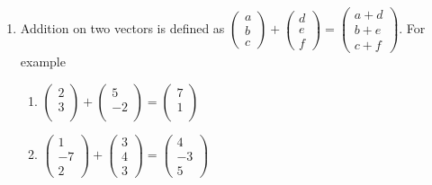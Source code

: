 \documentclass{article}
\begin{document}
\begin{enumerate}
    \item Addition on two vectors is defined as $ \begin{pmatrix}
  a\\
  b\\
  c
 \end{pmatrix}
 +
 \begin{pmatrix}
 d\\
 e\\
 f
\end{pmatrix}
=
 \begin{pmatrix}
a+d\\
b+e\\
c+f
\end{pmatrix}$. For example
            \begin{enumerate}
                 \item $\begin{pmatrix} 2\\ 3\\ \end{pmatrix} + \begin{pmatrix} 5\\ -2\\\end{pmatrix} = \begin{pmatrix} 7\\1\\ \end{pmatrix}$\\
                \item $\begin{pmatrix}
                    1\\
                    -7\\
                    2
                    \end{pmatrix}
                    +
                    \begin{pmatrix}
                        3\\
                        4\\
                        3
                    \end{pmatrix}
                     =
                    \begin{pmatrix}
                    4\\
                    -3\\
                    5
                    \end{pmatrix}$
            \end{enumerate}




\end{enumerate}
\end{document}
